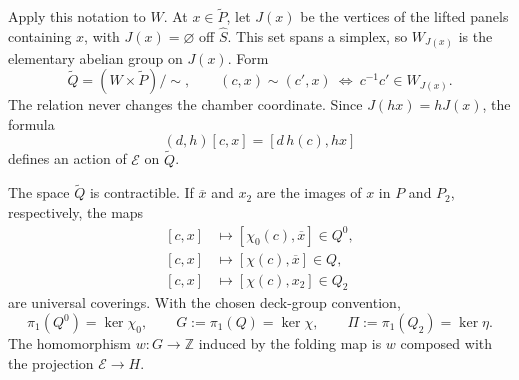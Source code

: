 Apply this notation to $W$.  At $x\in\widetilde P$, let
$J(x)$ be the vertices of the lifted panels containing $x$, with
$J(x)=\varnothing$ off $\widehat S$.  This set spans a simplex, so
$W_{J(x)}$ is the elementary abelian group on $J(x)$.  Form
\begin{equation}\label{ext:universal-space}
 \widetilde Q=(W\times\widetilde P)/\sim,\qquad
 (c,x)\sim(c',x)
 \ \Longleftrightarrow\ c^{-1}c'\in W_{J(x)}.
\end{equation}
The relation never changes the chamber coordinate.  Since
$J(hx)=hJ(x)$, the formula
\begin{equation}\label{ext:action}
 (d,h)[c,x]=[d\,h(c),hx]
\end{equation}
defines an action of $\mathcal E$ on $\widetilde Q$.

\begin{proposition}\label{ext:development}
The space $\widetilde Q$ is contractible.  If $\overline x$ and
$x_2$ are the images of $x$ in $P$ and $P_2$, respectively, the
maps
\[
 \begin{aligned}
 [c,x]&\longmapsto[\chi_0(c),\overline x]\in Q^0,\\
 [c,x]&\longmapsto[\chi(c),\overline x]\in Q,\\
 [c,x]&\longmapsto[\chi(c),x_2]\in Q_2
 \end{aligned}
\]
are universal coverings.  With the chosen deck-group convention,
\begin{equation}\label{ext:groups}
 \pi_1(Q^0)=\ker\chi_0,\qquad
 G:=\pi_1(Q)=\ker\chi,\qquad
 \Pi:=\pi_1(Q_2)=\ker\eta .
\end{equation}
The homomorphism $w\colon G\to\mathbb Z$ induced by the folding map
is $w$ composed with the projection $\mathcal E\to H$.
\end{proposition}

